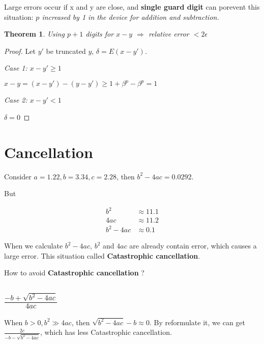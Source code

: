 \documentclass{article}
\newtheorem{theorem}{Theorem}
\begin{document}
        Large errors occur if x and y are close, and \textbf{single guard digit}
        can porevent this situation:
        {\it $p$ increased by 1 in the device for addition and subtraction.}

        
        \begin{theorem}
            Using $p+1$ digits for $x-y$ $\Rightarrow$ relative error $ < 2\epsilon$
        \end{theorem}

        \begin{proof}
            Let $y'$ be truncated $y$, $\delta = E(x - y')$.

            \emph{Case 1: $x - y' \geq 1$}

                $x - y = (x - y') - (y - y') \geq 1 + \beta^p - \beta^p = 1$

            \emph{Case 2: $x - y' < 1$}

                $\delta = 0$

        \end{proof}

        \section{Cancellation}

        Consider $a = 1.22, b = 3.34, c = 2.28$, then $b^2 - 4ac = 0.0292$.

        But
        
        \begin{align}
            b^2       &\approx 11.1 \\
            4ac       &\approx 11.2 \\
            b^2 - 4ac &\approx  0.1
        \end{align}

        When we calculate $b^2 - 4ac$, $b^2$ and $4ac$ are already contain error,
        which causes a large error. This situation called \textbf{Catastrophic cancellation}.

        How to avoid \textbf{Catastrophic cancellation} ?

        \subsection{$\frac{-b + \sqrt{b^2 - 4ac}}{4ac}$}

        When $b > 0, b^2 \gg 4ac$, then $\sqrt{b^2 - 4ac} - b \approx 0$.
        By reformulate it, we can get $\frac{2c}{- b - \sqrt{b^2 - 4ac}}$,
        which has less Catastrophic cancellation.
\end{document}
